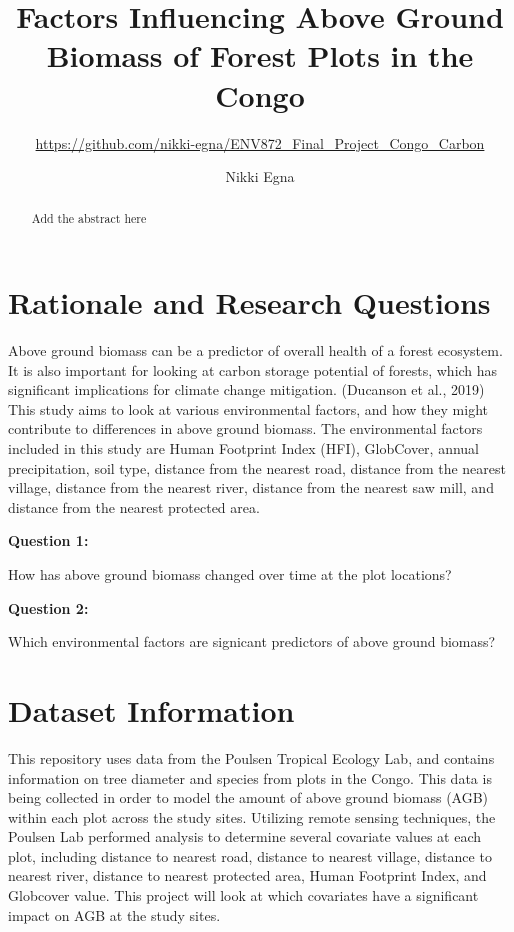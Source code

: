 \documentclass[12pt,]{article}
\title{Factors Influencing Above Ground Biomass of Forest Plots in the Congo}
\subtitle{\url{https://github.com/nikki-egna/ENV872_Final_Project_Congo_Carbon}}
\author{Nikki Egna}
\date{}
\begin{document}
\maketitle
\begin{abstract}
Add the abstract here
\end{abstract}

\newpage
\tableofcontents 
\newpage
\listoftables 
\newpage
\listoffigures

\newpage

\hypertarget{rationale-and-research-questions}{%
\section{Rationale and Research
Questions}\label{rationale-and-research-questions}}

Above ground biomass can be a predictor of overall health of a forest
ecosystem. It is also important for looking at carbon storage potential
of forests, which has significant implications for climate change
mitigation. (Ducanson et al., 2019) This study aims to look at various
environmental factors, and how they might contribute to differences in
above ground biomass. The environmental factors included in this study
are Human Footprint Index (HFI), GlobCover, annual precipitation, soil
type, distance from the nearest road, distance from the nearest village,
distance from the nearest river, distance from the nearest saw mill, and
distance from the nearest protected area.

\textbf{Question 1:}

How has above ground biomass changed over time at the plot locations?

\textbf{Question 2:}

Which environmental factors are signicant predictors of above ground
biomass?

\newpage

\hypertarget{dataset-information}{%
\section{Dataset Information}\label{dataset-information}}

This repository uses data from the Poulsen Tropical Ecology Lab, and
contains information on tree diameter and species from plots in the
Congo. This data is being collected in order to model the amount of
above ground biomass (AGB) within each plot across the study sites.
Utilizing remote sensing techniques, the Poulsen Lab performed analysis
to determine several covariate values at each plot, including distance
to nearest road, distance to nearest village, distance to nearest river,
distance to nearest protected area, Human Footprint Index, and Globcover
value. This project will look at which covariates have a significant
impact on AGB at the study sites.
\end{document}
